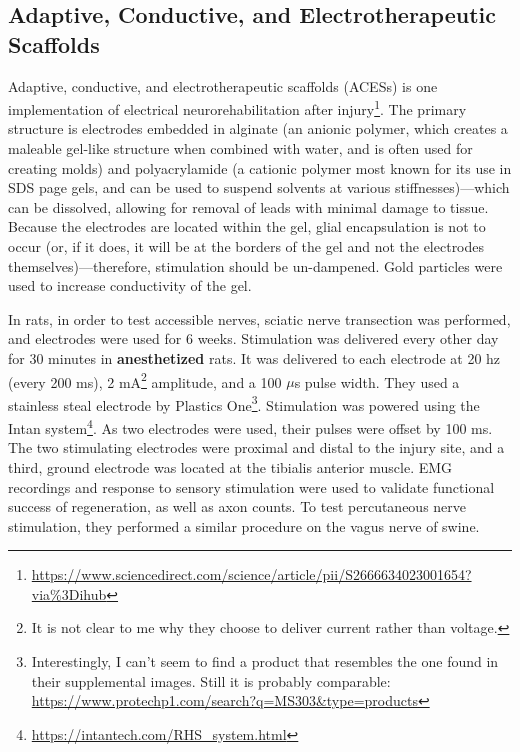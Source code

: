 \subsection{Adaptive, Conductive, and
Electrotherapeutic Scaffolds}
Adaptive, conductive, and electrotherapeutic scaffolds (ACESs) is one implementation of electrical neurorehabilitation after injury\footnote{\url{https://www.sciencedirect.com/science/article/pii/S2666634023001654?via\%3Dihub}}. The primary structure is electrodes embedded in alginate (an anionic polymer, which creates a maleable gel-like structure when combined with water, and is often used for creating molds) and polyacrylamide (a cationic polymer most known for its use in SDS page gels, and can be used to suspend solvents at various stiffnesses)---which can be dissolved, allowing for removal of leads with minimal damage to tissue. Because the electrodes are located within the gel, glial encapsulation is not to occur (or, if it does, it will be at the borders of the gel and not the electrodes themselves)---therefore, stimulation should be un-dampened. Gold particles were used to increase conductivity of the gel.\newline

In rats, in order to test accessible nerves, sciatic nerve transection was performed, and electrodes were used for 6 weeks. Stimulation was delivered every other day for 30 minutes in \textbf{anesthetized} rats. It was delivered to each electrode at 20 hz (every 200 ms), 2 mA\footnote{It is not clear to me why they choose to deliver current rather than voltage.} amplitude, and a 100 $\mu$s pulse width. They used a stainless steal electrode by Plastics One\footnote{Interestingly, I can't seem to find a product that resembles the one found in their supplemental images. Still it is probably comparable: \url{https://www.protechp1.com/search?q=MS303\&type=products}}. Stimulation was powered using the Intan system\footnote{\url{https://intantech.com/RHS_system.html}}. As two electrodes were used, their pulses were offset by 100 ms. The two stimulating electrodes were proximal and distal to the injury site, and a third, ground electrode was located at the tibialis anterior muscle. EMG recordings and response to sensory stimulation were used to validate functional success of regeneration, as well as axon counts. To test percutaneous nerve stimulation, they performed a similar procedure on the vagus nerve of swine.  


